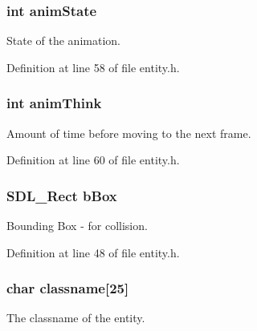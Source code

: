 \subsubsection[{anim\+State}]{\setlength{\rightskip}{0pt plus 5cm}int {\bf anim\+State}}\label{structentity__s_a1243efedb746d6c3b56bea6b10d3c851}


State of the animation. 



Definition at line 58 of file entity.\+h.

\hypertarget{structentity__s_af71c7e5e99c44ec4a2ee923a848e718b}{}
\subsubsection[{anim\+Think}]{\setlength{\rightskip}{0pt plus 5cm}int anim\+Think}\label{structentity__s_af71c7e5e99c44ec4a2ee923a848e718b}


Amount of time before moving to the next frame. 



Definition at line 60 of file entity.\+h.

\hypertarget{structentity__s_a8df2e6a526b260ce0a46bbe60c16f4a8}{}
\subsubsection[{b\+Box}]{\setlength{\rightskip}{0pt plus 5cm}S\+D\+L\+\_\+\+Rect b\+Box}\label{structentity__s_a8df2e6a526b260ce0a46bbe60c16f4a8}


Bounding Box -\/ for collision. 



Definition at line 48 of file entity.\+h.

\hypertarget{structentity__s_a810ee4074f3b71c09214fd9cfafcc922}{}
\subsubsection[{classname}]{\setlength{\rightskip}{0pt plus 5cm}char classname\mbox{[}25\mbox{]}}\label{structentity__s_a810ee4074f3b71c09214fd9cfafcc922}


The classname of the entity. 




